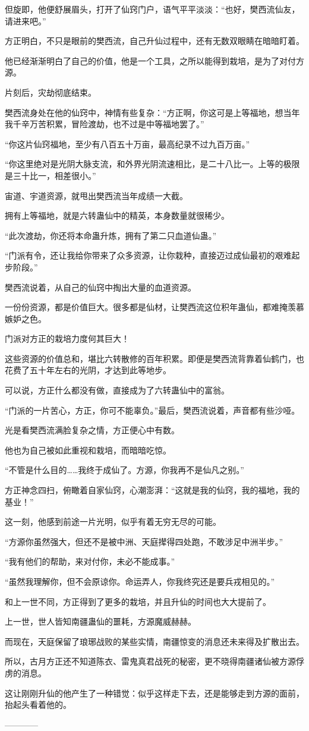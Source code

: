 \begin{this_body}
但旋即，他便舒展眉头，打开了仙窍门户，语气平平淡淡：“也好，樊西流仙友，请进来吧。”

方正明白，不只是眼前的樊西流，自己升仙过程中，还有无数双眼睛在暗暗盯着。

他已经渐渐明白了自己的价值，他是一个工具，之所以能得到栽培，是为了对付方源。

片刻后，灾劫彻底结束。

樊西流身处在他的仙窍中，神情有些复杂：“方正啊，你这可是上等福地，想当年我千辛万苦积累，冒险渡劫，也不过是中等福地罢了。”

“你这片仙窍福地，至少有八百五十万亩，最高纪录不过九百万亩。”

“你这里绝对是光阴大脉支流，和外界光阴流速相比，是二十八比一。上等的极限是三十比一，相差很小。”

宙道、宇道资源，就甩出樊西流当年成绩一大截。

拥有上等福地，就是六转蛊仙中的精英，本身数量就很稀少。

“此次渡劫，你还将本命蛊升炼，拥有了第二只血道仙蛊。”

“门派有令，还让我给你带来了众多资源，让你栽种，直接迈过成仙最初的艰难起步阶段。”

樊西流说着，从自己的仙窍中掏出大量的血道资源。

一份份资源，都是价值巨大。很多都是仙材，让樊西流这位积年蛊仙，都难掩羡慕嫉妒之色。

门派对方正的栽培力度何其巨大！

这些资源的价值总和，堪比六转散修的百年积累。即便是樊西流背靠着仙鹤门，也花费了五十年左右的光阴，才达到此等地步。

可以说，方正什么都没有做，直接成为了六转蛊仙中的富翁。

“门派的一片苦心，方正，你可不能辜负。”最后，樊西流说着，声音都有些沙哑。

光是看樊西流满脸复杂之情，方正便心中有数。

他也为自己被如此重视和栽培，而暗暗吃惊。

“不管是什么目的……我终于成仙了。方源，你我再不是仙凡之别。”

方正神念四扫，俯瞰着自家仙窍，心潮澎湃：“这就是我的仙窍，我的福地，我的基业！”

这一刻，他感到前途一片光明，似乎有着无穷无尽的可能。

“方源你虽然强大，但还不是被中洲、天庭撵得四处跑，不敢涉足中洲半步。”

“我有他们的帮助，来对付你，未必不能成事。”

“虽然我理解你，但不会原谅你。命运弄人，你我终究还是要兵戎相见的。”

和上一世不同，方正得到了更多的栽培，并且升仙的时间也大大提前了。

上一世，世人皆知南疆蛊仙的噩耗，方源魔威赫赫。

而现在，天庭保留了琅琊战败的某些实情，南疆惊变的消息还未来得及扩散出去。

所以，古月方正还不知道陈衣、雷鬼真君战死的秘密，更不晓得南疆诸仙被方源俘虏的消息。

这让刚刚升仙的他产生了一种错觉：似乎这样走下去，还是能够走到方源的面前，抬起头看着他的。

------------

\end{this_body}

